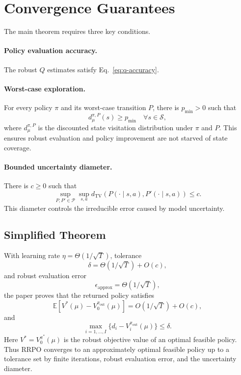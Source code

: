 \documentclass[11pt]{article}
\newcommand{\Sset}{\mathcal S}
\newcommand{\Pset}{\mathcal P}
\newcommand{\E}{\mathbb E}
\newcommand{\TV}{d_{\mathrm{TV}}}
\newcommand{\1}{\mathbf 1}
\newcommand{\epsapp}{\epsilon_{\mathrm{approx}}}
\begin{document}
\section{Convergence Guarantees}
The main theorem requires three key conditions.

\paragraph{Policy evaluation accuracy.}
The robust $Q$ estimates satisfy Eq.~\eqref{eq:q-accuracy}.

\paragraph{Worst-case exploration.}
For every policy $\pi$ and its worst-case transition $P$, there is $p_{\min}>0$ such that
\begin{equation}
    d_{\mu}^{\pi,P}(s)\ge p_{\min}\quad\forall s\in\Sset,
\end{equation}
where $d_{\mu}^{\pi,P}$ is the discounted state visitation distribution under $\pi$ and $P$.  This ensures robust evaluation and policy improvement are not starved of state coverage.

\paragraph{Bounded uncertainty diameter.}
There is $c\ge0$ such that
\begin{equation}
    \sup_{P,P'\in\Pset}\sup_{s,a}\TV(P(\cdot\mid s,a),P'(\cdot\mid s,a))\le c.
    \label{eq:diameter}
\end{equation}
This diameter controls the irreducible error caused by model uncertainty.

\subsection{Simplified Theorem}
With learning rate $\eta=\Theta(1/\sqrt T)$, tolerance
\begin{equation}
    \delta=\Theta(1/\sqrt T)+O(c),
\end{equation}
and robust evaluation error
\begin{equation}
    \epsapp=\Theta(1/\sqrt T),
\end{equation}
the paper proves that the returned policy satisfies
\begin{equation}
    \E[V^*(\mu)-V_0^{\pi_{\mathrm{out}}}(\mu)] = O(1/\sqrt T)+O(c),
\end{equation}
and
\begin{equation}
    \max_{i=1,\ldots,I}\{d_i-V_i^{\pi_{\mathrm{out}}}(\mu)\}\le\delta.
\end{equation}
Here $V^*=V_0^{\pi^*}(\mu)$ is the robust objective value of an optimal feasible policy.  Thus RRPO converges to an approximately optimal feasible policy up to a tolerance set by finite iterations, robust evaluation error, and the uncertainty diameter.
\end{document}
